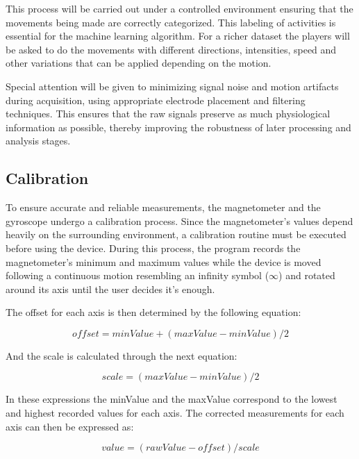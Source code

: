 This process will be carried out under a controlled environment ensuring that the movements being made are correctly categorized. This labeling of activities is essential for the machine learning algorithm.
For a richer dataset the players will be asked to do the movements with different directions, intensities, speed and other variations that can be applied depending on the motion.

Special attention will be given to minimizing signal noise and motion artifacts during acquisition, using appropriate electrode placement and filtering techniques. This ensures that the raw signals preserve as much physiological 
information as possible, thereby improving the robustness of later processing and analysis stages.



\subsection{Calibration}
\label{ssec:calibration}

To ensure accurate and reliable measurements, the magnetometer and the gyroscope undergo a calibration process. Since the magnetometer's values depend heavily on the surrounding environment, a calibration routine must be executed 
before using the device. During this process, the program records the magnetometer's minimum and maximum values while the device is moved following a continuous motion resembling an infinity 
symbol ($\infty$) and rotated around its axis until the user decides it's enough.

The offset for each axis is then determined by the following equation:

\begin{equation}
  offset = minValue + (maxValue - minValue) / 2
  \label{eq:offsetEQ}
\end{equation}

And the scale is calculated through the next equation:

\begin{equation}
  scale = (maxValue - minValue) / 2
  \label{eq:scaleEQ}
\end{equation}

In these expressions the minValue and the maxValue correspond to the lowest and highest recorded values for each axis. The corrected measurements for each axis can then be expressed as:

\begin{equation}
  value = (rawValue - offset) / scale
  \label{eq:magnetometerValueEQ}
\end{equation}

